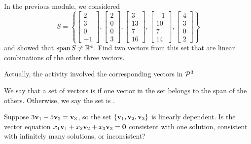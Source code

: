 


\begin{applicationActivities}

\begin{activity}{15}
  In the previous module, we considered
  \[S=\left\{
  \begin{bmatrix}2\\3\\0\\-1\end{bmatrix},
  \begin{bmatrix}2\\0\\0\\3\end{bmatrix},
  \begin{bmatrix}3\\13\\7\\16\end{bmatrix},
  \begin{bmatrix}-1\\10\\7\\14\end{bmatrix},
  \begin{bmatrix}4\\3\\0\\2\end{bmatrix}
  \right\}
  \]
  and showed that \(\vspan S\not=\IR^4\). Find two vectors from this set
  that are linear combinations of the other three vectors.

  \begin{TBLnote}
    Actually, the activity involved the corresponding vectors in \(\P^3\).
  \end{TBLnote}
\end{activity}

\begin{definition}
  We say that a set of vectors is  if one vector
  in the set belongs to the span of the others. Otherwise, we say the set
  is .
\end{definition}

\begin{activity}{10}
  Suppose \(3\vect v_1-5\vect v_2=\vect v_3\), so the set
  \(\{\vect v_1,\vect v_2,\vect v_3\}\) is linearly dependent.
  Is the vector equation \(x_1\vect v_1+x_2\vect v_2+x_3\vect v_3=\vect 0\)
  consistent with one solution, consistent with infinitely many solutions,
  or inconsistent?
\end{activity}


\end{applicationActivities}
